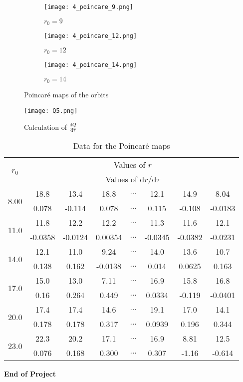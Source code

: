 \documentclass[12pt]{extarticle}
\begin{document}
\begin{figure}[h]
    \centering
    \begin{subfigure}[b]{0.4\textwidth}
        \texttt{[image: 4\_poincare\_9.png]}
        \caption{$r_0 = 9 $}
        \label{figure:12a}
    \end{subfigure}  
    \qquad
    \begin{subfigure}[b]{0.4\textwidth}
        \texttt{[image: 4\_poincare\_12.png]}
        \caption{$r_0 = 12 $}
        \label{figure:12b}
    \end{subfigure} 
    \qquad
    \begin{subfigure}[b]{0.4\textwidth}
        \texttt{[image: 4\_poincare\_14.png]}
        \caption{$r_0 = 14 $}
        \label{figure:12c}
    \end{subfigure}
    \caption{Poincar\'e maps of the orbits} 
    \label{figure 12}
\end{figure}

\FloatBarrier

\begin{figure}[h]
\centering
\texttt{[image: Q5.png]}\\
\caption{Calculation of $\frac{\mathrm{d}Q}{\mathrm{
d}\tau}$}
\label{figure:13}
\end{figure}

\begin{table}[!htbp]
\centering
\begin{tabular}{|c||ccccccc|}
\hline
\multirow{2}{2em}{$r_0$} & \multicolumn{7}{c|}{Values of $r$}\\ 
& \multicolumn{7}{c|}{Values of $\mathrm{d} r/\mathrm{d} \tau$}\\
\hline \hline
\multirow{2}{2em}{8.00}& 18.8 & 13.4 & 18.8 & $\hdots$ & 12.1&14.9 &8.04  \\ 
 & 0.078&-0.114 &0.078 & $\hdots$ & 0.115&-0.108 &  -0.0183\\ 
\hline
\multirow{2}{2em}{11.0}& 11.8 & 12.2 & 12.2 & $\hdots$ & 11.3& 11.6& 12.1 \\ 
& -0.0358 & -0.0124& 0.00354 & $\hdots$ & -0.0345 & -0.0382& -0.0231 \\ 
\hline
\multirow{2}{2em}{14.0} & 12.1 & 11.0 & 9.24 & $\hdots$ & 14.0 & 13.6 & 10.7 \\ 
& 0.138&0.162 &-0.0138 & $\hdots$ & 0.014&0.0625 & 0.163 \\ 
\hline
\multirow{2}{2em}{17.0} & 15.0 & 13.0 & 7.11 & $\hdots$ & 16.9 & 15.8 & 16.8 \\ 
& 0.16 & 0.264 & 0.449 & $\hdots$ & 0.0334 & -0.119 & -0.0401 \\ 
\hline
\multirow{2}{2em}{20.0} & 17.4 & 17.4 & 14.6 & $\hdots$ & 19.1 &17.0 &14.1  \\ 
& 0.178&0.178 &0.317 & $\hdots$ &0.0939 & 0.196 & 0.344 \\ 
\hline
\multirow{2}{2em}{23.0} & 22.3 & 20.2 & 17.1 & $\hdots$ & 16.9 &8.81 &12.5  \\ 
& 0.076 & 0.168 & 0.300 &$\hdots$ & 0.307 &-1.16 & -0.614  \\ 
\hline
\end{tabular}
\caption{Data for the Poincar\'e maps}
\label{Table:1}
\end{table}

\begin{center}
\textbf{End of Project}
\end{center}
\pagebreak


\end{document}
